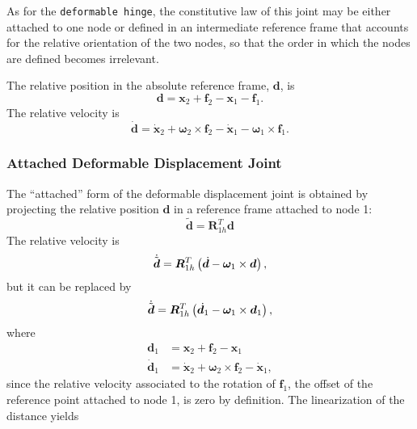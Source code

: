 \documentclass[10pt,dvips,fleqn,subeqn]{report}
\newcommand{\T}[1]{\bm{#1}}
\begin{document}
As for the \texttt{deformable hinge}, the constitutive law of this joint
may be either attached to one node or defined in an intermediate
reference frame that accounts for the relative orientation of the two nodes,
so that the order in which the nodes are defined becomes irrelevant.

The relative position in the absolute reference frame, $\T{d}$, is
\begin{equation}
	\T{d} = \T{x}_2 + \T{f}_2 - \T{x}_1 - \T{f}_1 .
\end{equation}
The relative velocity is
\begin{equation}
	\dot{\T{d}} = \dot{\T{x}}_2 + \T{\omega}_2 \times \T{f}_2
		- \dot{\T{x}}_1 - \T{\omega}_1 \times \T{f}_1 .
\end{equation}

\subsubsection{Attached Deformable Displacement Joint}
The ``attached'' form of the deformable displacement joint
is obtained by projecting the relative position $\T{d}$
in a reference frame attached to node 1:
\begin{equation}
	\tilde{\T{d}} = \T{R}_{1h}^T \T{d}
\end{equation}
The relative velocity is
\begin{equation}
	\dot{\tilde{\T{d}}} = \T{R}_{1h}^T\plbr{
		\dot{\T{d}} - \T{\omega}_1 \times \T{d}
	} ,
\end{equation}
but it can be replaced by
\begin{equation}
	\dot{\tilde{\T{d}}} = \T{R}_{1h}^T\plbr{
		\dot{\T{d}}_1 - \T{\omega}_1 \times \T{d}_1
	} ,
\end{equation}
where
\begin{subequations}
\begin{align}
	\T{d}_1 &= \T{x}_2 + \T{f}_2 - \T{x}_1 \\
	\dot{\T{d}}_1 &= \dot{\T{x}}_2 + \T{\omega}_2 \times \T{f}_2 - \dot{\T{x}}_1 ,
\end{align}
\end{subequations}
since the relative velocity associated to the rotation of $\T{f}_1$,
the offset of the reference point attached to node 1,
is zero by definition.
The linearization of the distance yields
\end{document}
